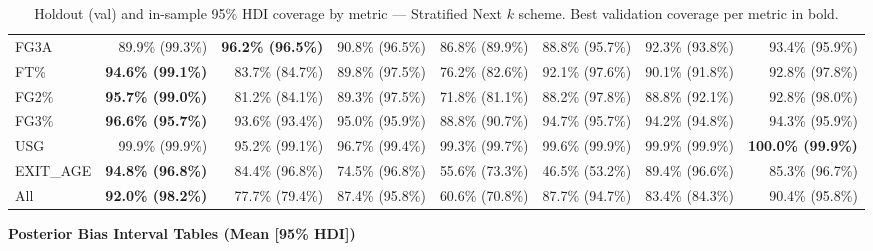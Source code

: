 \documentclass{article}
\begin{document}
\begin{table}[H]
{\begin{tabular}{lrrrrrrr}
FG3A & 89.9\% (99.3\%) & \textbf{96.2\% (96.5\%)} & 90.8\% (96.5\%) & 86.8\% (89.9\%) & 88.8\% (95.7\%) & 92.3\% (93.8\%) & 93.4\% (95.9\%) \\
FT\% & \textbf{94.6\% (99.1\%)} & 83.7\% (84.7\%) & 89.8\% (97.5\%) & 76.2\% (82.6\%) & 92.1\% (97.6\%) & 90.1\% (91.8\%) & 92.8\% (97.8\%) \\
FG2\% & \textbf{95.7\% (99.0\%)} & 81.2\% (84.1\%) & 89.3\% (97.5\%) & 71.8\% (81.1\%) & 88.2\% (97.8\%) & 88.8\% (92.1\%) & 92.8\% (98.0\%) \\
FG3\% & \textbf{96.6\% (95.7\%)} & 93.6\% (93.4\%) & 95.0\% (95.9\%) & 88.8\% (90.7\%) & 94.7\% (95.7\%) & 94.2\% (94.8\%) & 94.3\% (95.9\%) \\
USG & 99.9\% (99.9\%) & 95.2\% (99.1\%) & 96.7\% (99.4\%) & 99.3\% (99.7\%) & 99.6\% (99.9\%) & 99.9\% (99.9\%) & \textbf{100.0\% (99.9\%)} \\
EXIT\_AGE & \textbf{94.8\% (96.8\%)} & 84.4\% (96.8\%) & 74.5\% (96.8\%) & 55.6\% (73.3\%) & 46.5\% (53.2\%) & 89.4\% (96.6\%) & 85.3\% (96.7\%) \\
\midrule
All & \textbf{92.0\% (98.2\%)} & 77.7\% (79.4\%) & 87.4\% (95.8\%) & 60.6\% (70.8\%) & 87.7\% (94.7\%) & 83.4\% (84.3\%) & 90.4\% (95.8\%) \\
\bottomrule
\end{tabular}
}
\caption{Holdout (val) and in-sample 95\% HDI coverage by metric --- Stratified Next $k$ scheme. Best validation coverage per metric in bold.}
\label{tab:hdi_coverage_stratified_next_k}
\end{table}

\bigskip
{\centering\large\textbf{Posterior Bias Interval Tables (Mean [95\% HDI])}\\[4pt]}
\end{document}
